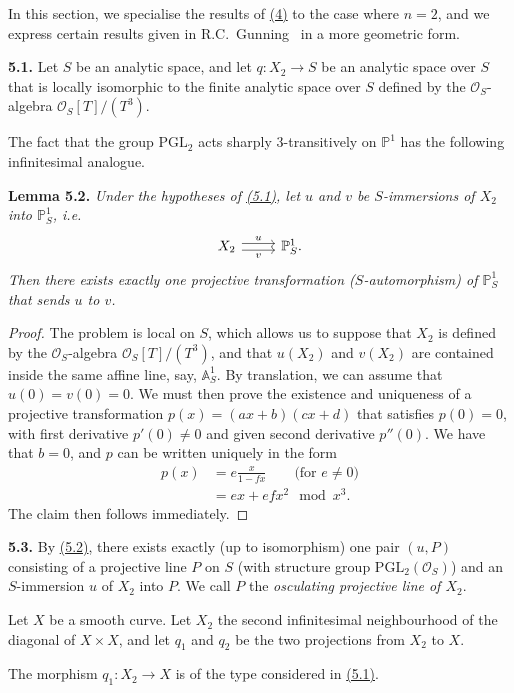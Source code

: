 \documentclass{report}
\newenvironment{itenv}[1]
  {\phantomsection\par\medskip\noindent\textbf{#1.}\itshape}
  {\par\medskip}
\newenvironment{rmenv}[1]
  {\phantomsection\par\medskip\noindent\textbf{#1.}\rmfamily}
  {\par\medskip}
\renewcommand{\cal}[1]{{\mathcal{#1}}}
\newcommand{\PP}{\mathbb{P}}
\renewcommand{\AA}{\mathbb{A}}
\newcommand{\oldpage}[1]{\marginpar{\footnotesize$\Big\vert$ \textit{p.~#1}}}
\begin{document}
In this section, we specialise the results of \hyperref[I.4]{(4)} to the case where $n=2$, and we express certain results given in R.C.~Gunning~\cite{11} in a more geometric form.

\begin{rmenv}{5.1}
\label{I.5.1}
  Let $S$ be an analytic space, and let $q\colon X_2\to S$ be an analytic space over $S$ that is locally isomorphic to the finite analytic space over $S$ defined by the $\cal{O}_S$-algebra $\cal{O}_S[T]/(T^3)$.

  The fact that the group $\mathrm{PGL}_2$ acts sharply $3$-transitively on $\PP^1$ has the following infinitesimal analogue.
\end{rmenv}

\begin{itenv}{Lemma 5.2}
\label{I.5.2}
  Under the hypotheses of \hyperref[I.5.1]{(5.1)}, let $u$ and $v$ be $S$-immersions of $X_2$ into $\PP_S^1$, i.e.
  \[
    \begin{tikzcd}
      X_2 \rar[shift left=1,"u"] \rar[shift right=1,swap,"v"]
      & \PP_S^1.
    \end{tikzcd}
  \]
  Then there exists exactly one projective transformation ($S$-automorphism) of $\PP_S^1$ that sends $u$ to $v$.
\end{itenv}

\begin{proof}
  The problem is local on $S$, which allows us to suppose that $X_2$ is defined by the $\cal{O}_S$-algebra $\cal{O}_S[T]/(T^3)$, and that $u(X_2)$ and $v(X_2)$ are contained inside the same affine line, say, $\AA_S^1$.
  By translation, we can assume that $u(0)=v(0)=0$.
  We must then prove the existence and uniqueness of a projective transformation $p(x)=(ax+b)(cx+d)$ that satisfies $p(0)=0$, with first derivative $p'(0)\neq0$ and given second derivative $p''(0)$.
  We have that $b=0$, and $p$ can be written uniquely in the form
\oldpage{30}
  \[
    \begin{aligned}
      p(x)
      &= e\frac{x}{1-fx} \qquad\mbox{(for $e\neq0$)}
    \\&= ex + efx^2 \mod x^3.
    \end{aligned}
  \]
  The claim then follows immediately.
\end{proof}

\begin{rmenv}{5.3}
\label{I.5.3}
  By \hyperref[I.5.2]{(5.2)}, there exists exactly (up to isomorphism) one pair $(u,P)$ consisting of a projective line $P$ on $S$ (with structure group $\mathrm{PGL}_2(\cal{O}_S)$) and an $S$-immersion $u$ of $X_2$ into $P$.
  We call $P$ the \emph{osculating projective line of $X_2$}.

  Let $X$ be a smooth curve.
  Let $X_2$ the second infinitesimal neighbourhood of the diagonal of $X\times X$, and let $q_1$ and $q_2$ be the two projections from $X_2$ to $X$.

  The morphism $q_1\colon X_2\to X$ is of the type considered in \hyperref[I.5.1]{(5.1)}.
\end{rmenv}
\end{document}
